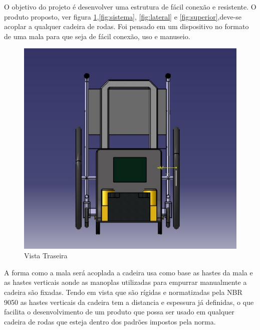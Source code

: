 O objetivo do projeto é desenvolver uma estrutura de fácil conexão e resistente. O produto proposto, ver figura \ref{fig:traseira},\ref{fig:sistema}, \ref{fig:lateral} e \ref{fig:superior},deve-se acoplar a qualquer cadeira de rodas. Foi pensado em um dispositivo no formato de uma mala para que seja de fácil conexão, uso e manuseio.

\begin{figure}[!htb]
\centering
\includegraphics[keepaspectratio=true,scale=0.4]{figuras/estrutura/vista_traseira}
\caption{Vista Traseira}
\label{fig:traseira}
\end{figure}

A forma como a mala será acoplada a cadeira usa como base as hastes da mala e as hastes verticais aonde as manoplas utilizadas para empurrar manualmente a cadeira são fixadas. Tendo em vista que são rígidas e normatizadas pela NBR 9050 as hastes verticais da cadeira tem a distancia e espessura já definidas, o que facilita o desenvolvimento de um produto que possa ser usado em qualquer cadeira de rodas que esteja dentro dos padrões impostos pela norma.


